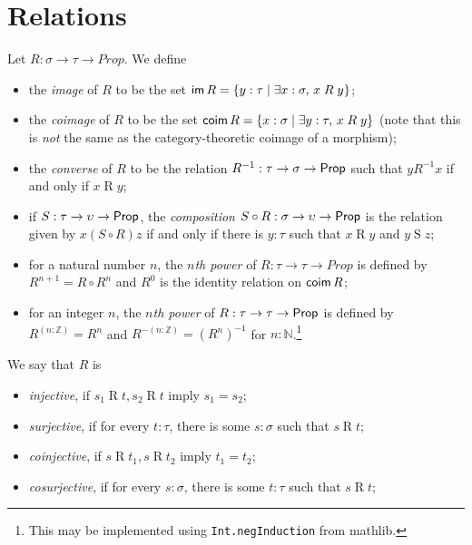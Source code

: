 \section{Relations}

\begin{definition-no-bp}
  \label{def:relation_props}
  Let \( R : \sigma \to \tau \to Prop \).
  We define
  \begin{itemize}
    \item the \emph{image} of \( R \) to be the set \( \operatorname{\mathsf{im}} R = \{ y : \tau \mid \exists x : \sigma,\, x \mathrel{R} y \} \);
    \item the \emph{coimage} of \( R \) to be the set \( \operatorname{\mathsf{coim}} R = \{ x : \sigma \mid \exists y : \tau,\, x \mathrel{R} y \} \) (note that this is \emph{not} the same as the category-theoretic coimage of a morphism);
    \item the \emph{converse} of \( R \) to be the relation \( R^{-1} : \tau \to \sigma \to \mathsf{Prop} \) such that \( y \mathrel{R^{-1}} x \) if and only if \( x \mathrel{R} y \);
    \item if \( S : \tau \to \upsilon \to \mathsf{Prop} \), the \emph{composition} \( S \circ R : \sigma \to \upsilon \to \mathsf{Prop} \) is the relation given by \( x \mathrel{(S\circ R)} z \) if and only if there is \( y : \tau \) such that \( x \mathrel{R} y \) and \( y \mathrel{S} z \);
    \item for a natural number \( n \), the \emph{\( n \)th power} of \( R : \tau \to \tau \to Prop \) is defined by \( R^{n+1} = R \circ R^n \) and \( R^0 \) is the identity relation on \( \operatorname{\mathsf{coim}} R \);
    \item for an integer \( n \), the \emph{\( n \)th power} of \( R : \tau \to \tau \to \mathsf{Prop} \) is defined by \( R^{(n : \mathbb Z)} = R^n \) and \( R^{-(n : \mathbb Z)} = (R^n)^{-1} \) for \( n : \mathbb N \).\footnote{This may be implemented using \texttt{Int.negInduction} from mathlib.}
  \end{itemize}
  We say that \( R \) is
  \begin{itemize}
    \item \emph{injective}, if \( s_1 \mathrel{R} t, s_2 \mathrel{R} t \) imply \( s_1 = s_2 \);
    \item \emph{surjective}, if for every \( t : \tau \), there is some \( s : \sigma \) such that \( s \mathrel{R} t \);
    \item \emph{coinjective}, if \( s \mathrel{R} t_1, s \mathrel{R} t_2 \) imply \( t_1 = t_2 \);
    \item \emph{cosurjective}, if for every \( s : \sigma \), there is some \( t : \tau \) such that \( s \mathrel{R} t \);

\end{itemize}
\end{definition-no-bp}
